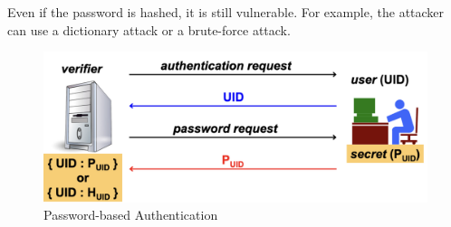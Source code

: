 \begin{tcolorbox}[colback=red!10!white, colframe=red!70!black, coltitle=white, title=Beware]
Even if the password is hashed, it is still vulnerable. For example, the attacker can use a dictionary attack or a brute-force attack.
\end{tcolorbox}
\begin{figure}[H]
    \centering
    \includegraphics[width=0.5\linewidth]{Images/Authentication/pb_authn.png}
    \caption{Password-based Authentication}
\end{figure}



